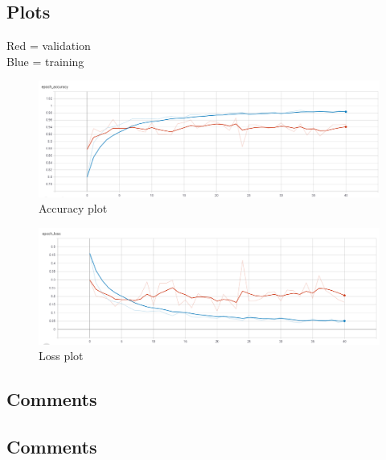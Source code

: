 \documentclass[12pt,a4paper]{report}
\begin{document}
\subsection{Plots}
Red = validation\\
Blue = training
\begin{figure}[H]
	\includegraphics[scale = 0.6, center]{ResNet accuracy}
	\caption{Accuracy plot}
\end{figure}
\begin{figure}[H]
	\includegraphics[scale = 0.6, center]{ResNet loss}
	\caption{Loss plot}
\end{figure}
\subsection{Comments}
\subsection{Comments}		
		
		
	
\end{document}
